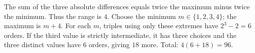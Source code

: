 The sum of the three absolute differences equals twice the maximum minus twice the minimum. Thus the range is $4$. Choose the minimum $m\in\{1,2,3,4\}$; the maximum is $m+4$. For each $m$, triples using only these extremes have $2^3-2=6$ orders. If the third value is strictly intermediate, it has three choices and the three distinct values have $6$ orders, giving $18$ more. Total: $4(6+18)=\boxed{96}$.
